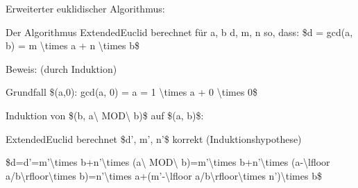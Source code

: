 \documentclass[a4paper]{article}
\begin{document}
\begin{multicols}{3}
\begin{itemize*}
            \item Erweiterter euklidischer Algorithmus:
            \begin{itemize*}
                  \item Der Algorithmus ExtendedEuclid berechnet für a, b d, m, n so, dass: \$d = gcd(a, b) = m \textbackslash times a + n \textbackslash times b\$
            \end{itemize*}
            \begin{itemize*}
                  \item Beweis: (durch Induktion)
                  \begin{itemize*} \item Grundfall \$(a,0): gcd(a, 0) = a = 1 \textbackslash times a + 0 \textbackslash times 0\$ \item Induktion von \$(b, a\textbackslash{} MOD\textbackslash{} b)\$ auf \$(a, b)\$:
                        \begin{itemize*} \item ExtendedEuclid berechnet \$d', m', n'\$ korrekt (Induktionshypothese) \item \$d=d'=m'\textbackslash times b+n'\textbackslash times (a\textbackslash{} MOD\textbackslash{} b)=m'\textbackslash times b+n'\textbackslash times (a-\textbackslash lfloor a/b\textbackslash rfloor\textbackslash times b)=n'\textbackslash times a+(m'-\textbackslash lfloor a/b\textbackslash rfloor\textbackslash times n')\textbackslash times b\$ \end{itemize*} \end{itemize*}

\end{itemize*}
\end{itemize*}
\end{multicols}
\end{document}
